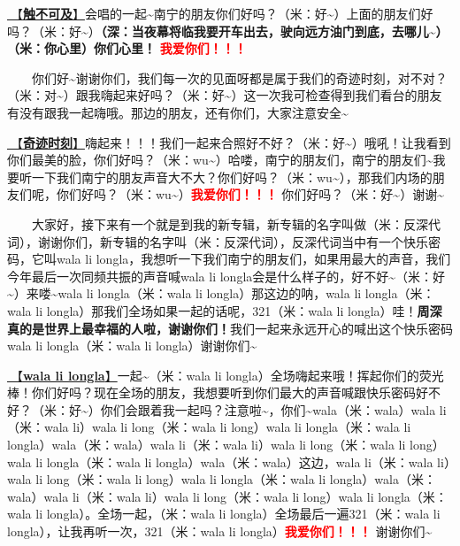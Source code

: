 \documentclass[]{ctexbook}
\begin{document}
\hyperref[untouchable]{🎵【\textbf{触不可及}】}会唱的一起\textasciitilde 南宁的朋友你们好吗？（米：好\textasciitilde）上面的朋友们好吗？（米：好\textasciitilde）\textbf{（深：当夜幕将临我要开车出去，驶向远方油门到底，去哪儿\textasciitilde）（米：你心里）你们心里！} \textbf{\textcolor{red}{我爱你们！！！} }

  你们好\textasciitilde 谢谢你们，我们每一次的见面呀都是属于我们的奇迹时刻，对不对？（米：对\textasciitilde）跟我嗨起来好吗？（米：好\textasciitilde）这一次我可检查得到我们看台的朋友有没有跟我一起嗨哦。那边的朋友，还有你们，大家注意安全\textasciitilde{}

\hyperref[magic-moment]{🎵【\textbf{奇迹时刻}】}嗨起来！！！我们一起来合照好不好？（米：好\textasciitilde）哦吼！让我看到你们最美的脸，你们好吗？（米：wu\textasciitilde）哈喽，南宁的朋友们，南宁的朋友们\textasciitilde 我要听一下我们南宁的朋友声音大不大？你们好吗？（米：wu\textasciitilde），那我们内场的朋友们呢，你们好吗？（米：wu\textasciitilde）\textbf{\textcolor{red}{我爱你们！！！} }你们好吗？（米：好\textasciitilde）谢谢\textasciitilde{}

  大家好，接下来有一个就是到我的新专辑，新专辑的名字叫做（米：反深代词），谢谢你们，新专辑的名字叫（米：反深代词），反深代词当中有一个快乐密码，它叫wala li longla，我想听一下我们南宁的朋友们，如果用最大的声音，我们今年最后一次同频共振的声音喊wala li longla会是什么样子的，好不好\textasciitilde（米：好\textasciitilde）来喽\textasciitilde wala li longla（米：wala li longla）那这边的呐，wala li longla（米：wala li longla）那我们全场如果一起的话呢，321（米：wala li longla）哇！\textbf{周深真的是世界上最幸福的人啦，谢谢你们！}我们一起来永远开心的喊出这个快乐密码wala li longla（米：wala li longla）谢谢你们\textasciitilde{}

\hyperref[wala-li-longla]{🎵【\textbf{wala li longla}】}一起\textasciitilde（米：wala li longla）全场嗨起来哦！挥起你们的荧光棒！你们好吗？现在全场的朋友，我想要听到你们最大的声音喊跟快乐密码好不好？（米：好\textasciitilde）你们会跟着我一起吗？注意啦\textasciitilde，你们\textasciitilde wala（米：wala）wala li（米：wala li）wala li long（米：wala li long）wala li longla（米：wala li longla）wala（米：wala）wala li（米：wala li）wala li long（米：wala li long）wala li longla（米：wala li longla）wala（米：wala）这边，wala li（米：wala li）wala li long（米：wala li long）wala li longla（米：wala li longla）wala（米：wala）wala li（米：wala li）wala li long（米：wala li long）wala li longla（米：wala li longla）。全场一起，（米：wala li longla）全场最后一遍321（米：wala li longla），让我再听一次，321（米：wala li longla）\textbf{\textcolor{red}{我爱你们！！！} }谢谢你们\textasciitilde{}
\end{document}
